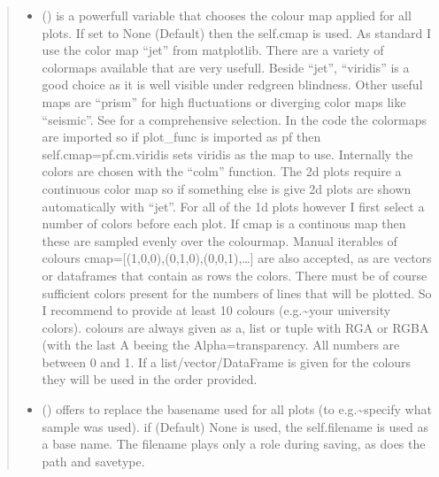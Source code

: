 \documentclass[letterpaper,10pt,english]{sphinxmanual}
\begin{document}
\begin{fulllineitems}
\begin{fulllineitems}
\begin{quote}
\begin{description}
\begin{itemize}
\item {} 
 (\sphinxstyleliteralemphasis{\sphinxupquote{, }}) \textendash{} is a powerfull variable that chooses the colour map applied for all plots. If set to
None (Default) then the self.cmap is used.
As standard I use the color map “jet” from matplotlib. There are a variety of colormaps
available that are very usefull. Beside “jet”, “viridis” is a good choice as it is well
visible under red\sphinxhyphen{}green blindness. Other useful maps are “prism” for high fluctuations
or diverging color maps like “seismic”.
See  for a comprehensive
selection. In the code the colormaps are imported so if plot\_func is imported as pf then
self.cmap=pf.cm.viridis sets viridis as the map to use. Internally the colors are chosen
with the “colm” function. The 2d plots require a continuous color map so if something
else is give 2d plots are shown automatically with “jet”. For all of the 1d plots however
I first select a number of colors before each plot. If cmap is a continous map then these
are sampled evenly over the colourmap. Manual iterables of colours
cmap={[}(1,0,0),(0,1,0),(0,0,1),…{]} are also accepted, as are vectors or dataframes that
contain as rows the colors. There must be of course sufficient colors present for
the numbers of lines that will be plotted. So I recommend to provide at least 10 colours
(e.g.\textasciitilde{}your university colors). colours are always given as a, list or tuple with RGA or RGBA
(with the last A beeing the Alpha=transparency. All numbers are between 0 and 1.
If a list/vector/DataFrame is given for the colours they will be used in the order provided.

\item {} 
 (\sphinxstyleliteralemphasis{\sphinxupquote{, }}) \textendash{} offers to replace the base\sphinxhyphen{}name used for all plots (to e.g.\textasciitilde{}specify what sample was used).
if (Default) None is used, the self.filename is used as a base name. The filename plays only a
role during saving, as does the path and savetype.


\end{itemize}
\end{description}
\end{quote}
\end{fulllineitems}
\end{fulllineitems}
\end{document}
